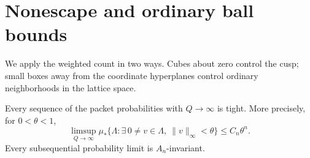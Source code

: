 \section{Nonescape and ordinary ball bounds}\label{sec:geometry}

We apply the weighted count in two ways. Cubes about zero control
the cusp; small boxes away from the coordinate hyperplanes control
ordinary neighborhoods in the lattice space.

\begin{proposition}\label{prop:tightness}
Every sequence of the packet probabilities with $Q\to\infty$
is tight. More precisely, for $0<\theta<1$,
\begin{equation}\label{eq:cusp}
 \limsup_{Q\to\infty}\mu_*
 \{\Lambda:\exists\,0\ne v\in\Lambda,\ \|v\|_\infty<\theta\}
       \le C_n\theta^n.
\end{equation}
Every subsequential probability limit is $A_n$-invariant.
\end{proposition}

